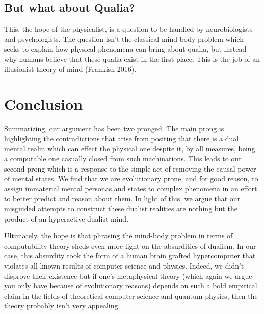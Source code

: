 \documentclass[11pt]{diazessay} %
\begin{document}
	\subsection{But what about Qualia?}
		This, the hope of the physicalist, is a question to be handled by neurobiologists and psychologists. The question isn't the classical mind-body problem which seeks to explain how physical phenomena can bring about qualia, but instead why humans believe that these qualia exist in the first place. This is the job of an illusionist theory of mind (Frankish 2016).


\section{Conclusion}
	Summarizing, our argument has been two pronged. The main prong is highlighting the contradictions that arise from positing that there is a dual mental realm which can effect the physical one despite it, by all measures, being a computable one casually closed from such machinations. This leads to our second prong which is a response to the simple act of removing the causal power of mental states. We find that we are evolutionary prone, and for good reason, to assign immaterial mental personas and states to complex phenomena in an effort to better predict and reason about them. In light of this, we argue that our misguided attempts to construct these dualist realities are nothing but the product of an hyperactive dualist mind.

	Ultimately, the hope is that phrasing the mind-body problem in terms of computability theory sheds even more light on the absurdities of dualism. In our case, this absurdity took the form of a human brain grafted hypercomputer that violates all known results of computer science and physics. Indeed, we didn't disprove their existence but if one's metaphysical theory (which again we argue you only have because of evolutionary reasons) depends on such a bold empirical claim in the fields of theoretical computer science and quantum physics, then the theory probably isn't very appealing.

\end{document}
